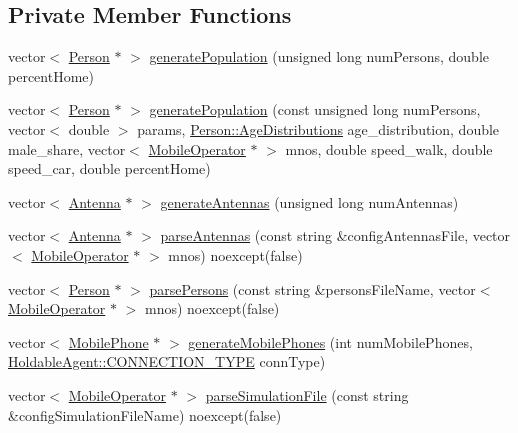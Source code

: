 \subsection*{Private Member Functions}
\begin{DoxyCompactItemize}
\item 
vector$<$ \mbox{\hyperlink{class_person}{Person}} $\ast$ $>$ \mbox{\hyperlink{class_world_ada780d7d546a1dad038c83aad3f696df}{generate\+Population}} (unsigned long num\+Persons, double percent\+Home)
\item 
vector$<$ \mbox{\hyperlink{class_person}{Person}} $\ast$ $>$ \mbox{\hyperlink{class_world_aa71599bf0bb4bf52e31b84a91342c6b1}{generate\+Population}} (const unsigned long num\+Persons, vector$<$ double $>$ params, \mbox{\hyperlink{class_person_a53376a9a5852ec7760488a01c37f0b0b}{Person\+::\+Age\+Distributions}} age\+\_\+distribution, double male\+\_\+share, vector$<$ \mbox{\hyperlink{class_mobile_operator}{Mobile\+Operator}} $\ast$ $>$ mnos, double speed\+\_\+walk, double speed\+\_\+car, double percent\+Home)
\item 
vector$<$ \mbox{\hyperlink{class_antenna}{Antenna}} $\ast$ $>$ \mbox{\hyperlink{class_world_adbd58c8093be1ac349d929d9a4bc2ab0}{generate\+Antennas}} (unsigned long num\+Antennas)
\item 
vector$<$ \mbox{\hyperlink{class_antenna}{Antenna}} $\ast$ $>$ \mbox{\hyperlink{class_world_a65aeb82bc52e45f024bcb966cc111cfc}{parse\+Antennas}} (const string \&config\+Antennas\+File, vector$<$ \mbox{\hyperlink{class_mobile_operator}{Mobile\+Operator}} $\ast$ $>$ mnos) noexcept(false)
\item 
vector$<$ \mbox{\hyperlink{class_person}{Person}} $\ast$ $>$ \mbox{\hyperlink{class_world_ac1ff7166ee1c03da452c0454f471fcef}{parse\+Persons}} (const string \&persons\+File\+Name, vector$<$ \mbox{\hyperlink{class_mobile_operator}{Mobile\+Operator}} $\ast$ $>$ mnos) noexcept(false)
\item 
vector$<$ \mbox{\hyperlink{class_mobile_phone}{Mobile\+Phone}} $\ast$ $>$ \mbox{\hyperlink{class_world_a9ba6bd08d85c5f610ea30bf4f74b925d}{generate\+Mobile\+Phones}} (int num\+Mobile\+Phones, \mbox{\hyperlink{class_holdable_agent_ae2c334b004d7b9c5a999cf2618e4e518}{Holdable\+Agent\+::\+C\+O\+N\+N\+E\+C\+T\+I\+O\+N\+\_\+\+T\+Y\+PE}} conn\+Type)
\item 
vector$<$ \mbox{\hyperlink{class_mobile_operator}{Mobile\+Operator}} $\ast$ $>$ \mbox{\hyperlink{class_world_adef43cc4ccb918aa68c00ee1e3286321}{parse\+Simulation\+File}} (const string \&config\+Simulation\+File\+Name) noexcept(false)

\end{DoxyCompactItemize}
